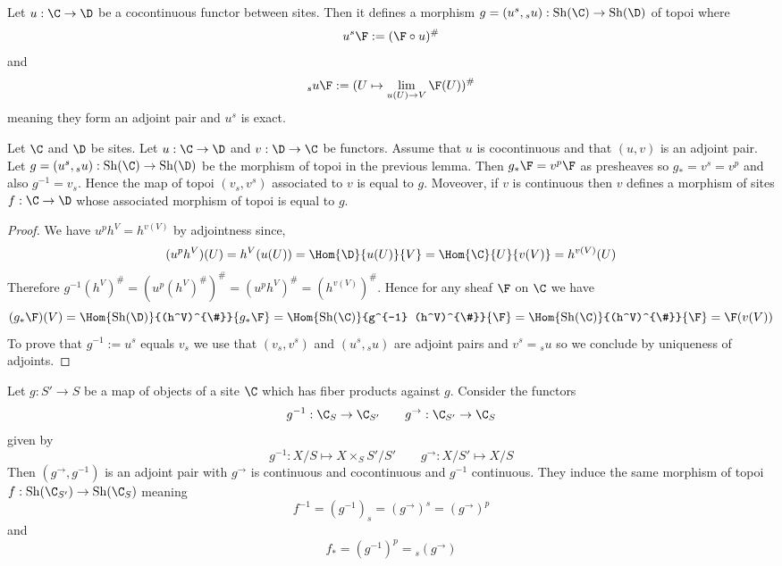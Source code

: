 \documentclass[12pt]{article}
\begin{document}
\begin{lemma}
Let $u : \C \to \D$ be a cocontinuous functor between sites. Then it defines a morphism $g = (u^s, {}_s u) : \Sh(\C) \to \Sh(\D)$ of topoi where
\[ u^s \F := (\F \circ u)^{\#} \]
and 
\[ {}_s u \F := (U \mapsto \lim_{u(U) \to V} \F(U))^{\#} \]
meaning they form an adjoint pair and $u^s$ is exact. 
\end{lemma}

\begin{lemma} \label{lemma:cocontinuous_adjoint_pair}
Let $\C$ and $\D$ be sites. Let $u : \C \to \D$ and $v : \D \to \C$ be functors. Assume that $u$ is cocontinuous and that $(u, v)$ is an adjoint pair. Let $g = (u^s, {}_s u) : \Sh(\C) \to \Sh(\D)$ be the morphism of topoi in the previous lemma. Then $g_* \F = v^p \F$ as presheaves so $g_* = v^s = v^p$ and also $g^{-1} = v_s$. Hence the map of topoi $(v_s, v^s)$ associated to $v$ is equal to $g$. Moveover, if $v$ is continuous then $v$ defines a morphism of sites $f : \C \to \D$ whose associated morphism of topoi is equal to $g$.
\end{lemma}

\begin{proof}
We have $u^p h^V = h^{v(V)}$ by adjointness since,
\[ (u^p h^V)(U) = h^V(u(U)) = \Hom{\D}{u(U)}{V} = \Hom{\C}{U}{v(V)} = h^{v(V)}(U) \]
Therefore $g^{-1} (h^V)^{\#} = (u^p (h^V)^{\#})^{\#} = (u^p h^V)^{\#} = (h^{v(V)})^{\#}$. Hence for any sheaf $\F$ on $\C$ we have
\[ (g_* \F)(V) = \Hom{\Sh(\D)}{(h^V)^{\#}}{g_* \F} = \Hom{\Sh(\C)}{g^{-1} (h^V)^{\#}}{\F} = \Hom{\Sh(\C)}{(h^V)^{\#}}{\F} = \F(v(V)) \]
To prove that $g^{-1} := u^s$ equals $v_s$ we use that $(v_s, v^s)$ and $(u^s, {}_s u)$ are adjoint pairs and $v^s = {}_s u$ so we conclude by uniqueness of adjoints.
\end{proof}

\begin{lemma}
Let $g : S' \to S$ be a map of objects of a site $\C$ which has fiber products against $g$. Consider the functors 
\[ g^{-1} : \C_S \to \C_{S'} \quad \quad g^{\to} : \C_{S'} \to \C_{S} \]
given by
\[ g^{-1} : X/S \mapsto X \times_S S' / S' \quad \quad g^{\to} : X / S' \mapsto X / S \]
Then $(g^{\to}, g^{-1})$ is an adjoint pair with $g^{\to}$ is continuous and cocontinuous and $g^{-1}$ continuous. They induce the same morphism of topoi $f : \Sh(\C_{S'}) \to \Sh(\C_{S})$ meaning
\[ f^{-1} = (g^{-1})_s = (g^{\to})^s = (g^{\to})^p \]
and 
\[ f_* = (g^{-1})^p = {}_s (g^{\to}) \]
\end{lemma}
\end{document}
